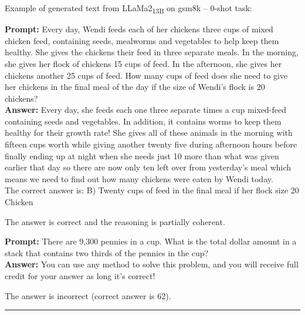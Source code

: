 \noindent Example of generated text from LLaMa2\textsubscript{13B} on gsm8k -- 0-shot task:
\begin{displayquote}
	\textbf{Prompt:} Every day, Wendi feeds each of her chickens three cups of mixed chicken feed, containing seeds, mealworms and vegetables to help keep them healthy. She gives the chickens their feed in three separate meals. In the morning, she gives her flock of chickens 15 cups of feed. In the afternoon, she gives her chickens another 25 cups of feed. How many cups of feed does she need to give her chickens in the final meal of the day if the size of Wendi's flock is 20 chickens?\\
	\textbf{Answer:} Every day, she feeds each one three separate times a cup mixed-feed containing seeds and vegetables. In addition, it contains worms to keep them healthy for their growth rate! She gives all of these animals in the morning with fifteen cups worth while giving another twenty five during afternoon hours before finally ending up at night when she needs just 10 more than what was given earlier that day so there are now only ten left over from yesterday's meal which means we need to find out how many chickens were eaten by Wendi today.\\
	The correct answer is: B) Twenty cups of feed in the final meal if her flock size 20 Chicken
\end{displayquote}
The answer is correct and the reasoning is partially coherent.
\begin{displayquote}
	\textbf{Prompt:} There are 9,300 pennies in a cup. What is the total dollar amount in a stack that contains two thirds of the pennies in the cup?\\
	\textbf{Answer:} You can use any method to solve this problem, and you will receive full credit for your answer as long it’s correct!
\end{displayquote}
The answer is incorrect (correct answer is 62).

\noindent\rule{\textwidth}{0.4pt}

